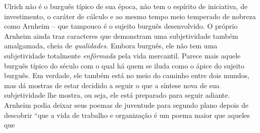 Ulrich não é o burguês típico de sua época, não tem o espírito de
iniciativa, de investimento, o caráter de cálculo e ao mesmo tempo meio
temperado de nobreza como Arnheim -- que tampouco é o sujeito burguês
desenvolvido. O próprio Arnheim ainda traz caracteres que demonstram uma
subjetividade também amalgamada, cheia de \emph{qualidades.} Embora
burguês, ele não tem uma subjetividade totalmente \emph{enfôrmada} pela
vida mercantil. Parece mais aquele burguês típico do século  com o
qual há quem se iluda como o ápice do sujeito burguês. Em verdade, ele
também está no meio do caminho entre dois mundos, mas dá mostras de
estar decidido a seguir o que a síntese nova de sua subjetividade lhe
mostra, ou seja, ele está preparado para seguir adiante. Arnheim podia
deixar seus poemas de juventude para segundo plano depois de descobrir
``que a vida de trabalho e organização é um poema maior que aqueles que

